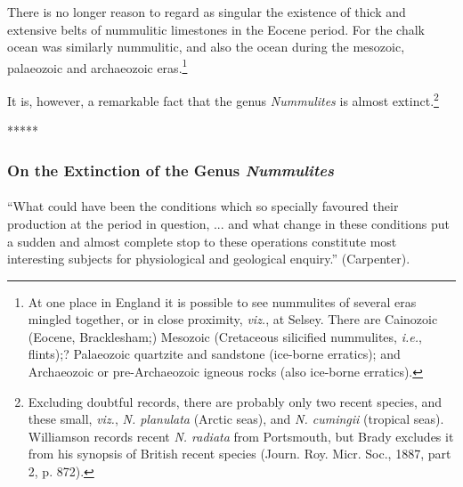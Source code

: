 \documentclass[a4paper, 12pt, oneside]{article}
\begin{document}
There is no longer reason to regard as singular the existence of thick and extensive belts of nummulitic limestones in the Eocene period. For the chalk ocean was similarly nummulitic, and also the ocean during the mesozoic, palaeozoic and archaeozoic eras.\footnote{At one place in England it is possible to see nummulites of several eras mingled together, or in close proximity, \emph{viz.}, at Selsey. There are Cainozoic (Eocene, Bracklesham;) Mesozoic (Cretaceous silicified nummulites, \emph{i.e.}, flints);? Palaeozoic quartzite and sandstone (ice-borne erratics); and Archaeozoic or pre-Archaeozoic igneous rocks (also ice-borne erratics).}

It is, however, a remarkable fact that the genus \emph{Nummulites} is almost extinct.\footnote{Excluding doubtful records, there are probably only two recent species, and these small, \emph{viz.}, \emph{N. planulata} (Arctic seas), and \emph{N. cumingii} (tropical seas). Williamson records recent \emph{N. radiata} from Portsmouth, but Brady excludes it from his synopsis of British recent species (Journ. Roy. Micr. Soc., 1887, part 2, p. 872).}

\centerline{*\hspace{15mm}*\hspace{15mm}*\hspace{15mm}*\hspace{15mm}*}
\bigskip

\subsubsection{On the Extinction of the Genus \emph{Nummulites}}
\paragraph{}
``What could have been the conditions which so specially favoured their production at the period in question, ... and what change in these conditions put a sudden and almost complete stop to these operations constitute most interesting subjects for physiological and geological enquiry.'' (Carpenter).
\end{document}
